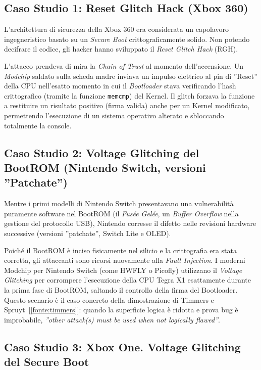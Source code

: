 \subsection{Caso Studio 1: Reset Glitch Hack (Xbox 360)}

L'architettura di sicurezza della Xbox 360 era considerata un capolavoro ingegneristico basato su un \textit{Secure Boot} crittograficamente solido. Non potendo decifrare il codice, gli hacker hanno sviluppato il \textit{Reset Glitch Hack} (RGH).

L'attacco prendeva di mira la \textit{Chain of Trust} al momento dell'accensione. Un \textit{Modchip} saldato sulla scheda madre inviava un impulso elettrico al pin di ''Reset'' della CPU nell'esatto momento in cui il \textit{Bootloader} stava verificando l'hash crittografico (tramite la funzione \texttt{memcmp}) del Kernel. Il glitch forzava la funzione a restituire un risultato positivo (firma valida) anche per un Kernel modificato, permettendo l'esecuzione di un sistema operativo alterato e sbloccando totalmente la console.

\subsection{Caso Studio 2: Voltage Glitching del BootROM (Nintendo Switch, versioni ''Patchate'')}

Mentre i primi modelli di Nintendo Switch presentavano una vulnerabilità puramente software nel BootROM (il \textit{Fusée Gelée}, un \textit{Buffer Overflow} nella gestione del protocollo USB), Nintendo corresse il difetto nelle revisioni hardware successive (versioni ''patchate'', Switch Lite e OLED).

Poiché il BootROM è inciso fisicamente nel silicio e la crittografia era stata corretta, gli attaccanti sono ricorsi nuovamente alla \textit{Fault Injection}. I moderni Modchip per Nintendo Switch (come HWFLY o Picofly) utilizzano il \textit{Voltage Glitching} per corrompere l'esecuzione della CPU Tegra X1 esattamente durante la prima fase di BootROM, saltando il controllo della firma del Bootloader. Questo scenario è il caso concreto della dimostrazione di Timmers e Spruyt~[\ref{fonte:timmers}]: quando la superficie logica è ridotta e prova bug è improbabile, \textit{''other attack(s) must be used when not logically flawed''}.

\subsection{Caso Studio 3: Xbox One. Voltage Glitching del Secure Boot}

